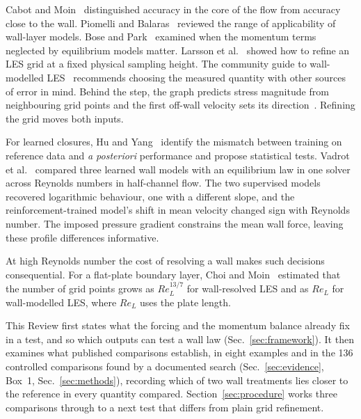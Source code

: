 \documentclass[pdflatex,sn-nature,iicol]{sn-jnl}
\begin{document}
Cabot and Moin~\cite{CabotMoin2000} distinguished accuracy in the core of the flow from accuracy close to the wall. Piomelli and Balaras~\cite{PiomelliBalaras2002} reviewed the range of applicability of wall-layer models. Bose and Park~\cite{BosePark2018} examined when the momentum terms neglected by equilibrium models matter. Larsson et al.~\cite{Larsson2016} showed how to refine an LES grid at a fixed physical sampling height. The community guide to wall-modelled LES~\cite{WMLESValidation} recommends choosing the measured quantity with other sources of error in mind. Behind the step, the graph predicts stress magnitude from neighbouring grid points and the first off-wall velocity sets its direction~\cite{Dupuy2023graph}. Refining the grid moves both inputs.

For learned closures, Hu and Yang~\cite{HuYang2026} identify the mismatch between training on reference data and \emph{a posteriori} performance and propose statistical tests. Vadrot et al.~\cite{Vadrot2023} compared three learned wall models with an equilibrium law in one solver across Reynolds numbers in half-channel flow. The two supervised models recovered logarithmic behaviour, one with a different slope, and the reinforcement-trained model's shift in mean velocity changed sign with Reynolds number. The imposed pressure gradient constrains the mean wall force, leaving these profile differences informative.

At high Reynolds number the cost of resolving a wall makes such decisions consequential. For a flat-plate boundary layer, Choi and Moin~\cite{ChoiMoin2012} estimated that the number of grid points grows as $Re_L^{13/7}$ for wall-resolved LES and as $Re_L$ for wall-modelled LES, where $Re_L$ uses the plate length. 

This Review first states what the forcing and the momentum balance already fix in a test, and so which outputs can test a wall law (Sec.~\ref{sec:framework}). It then examines what published comparisons establish, in eight examples and in the 136 controlled comparisons found by a documented search (Sec.~\ref{sec:evidence}, Box~1, Sec.~\ref{sec:methods}), recording which of two wall treatments lies closer to the reference in every quantity compared. Section~\ref{sec:procedure} works three comparisons through to a next test that differs from plain grid refinement.
\end{document}
